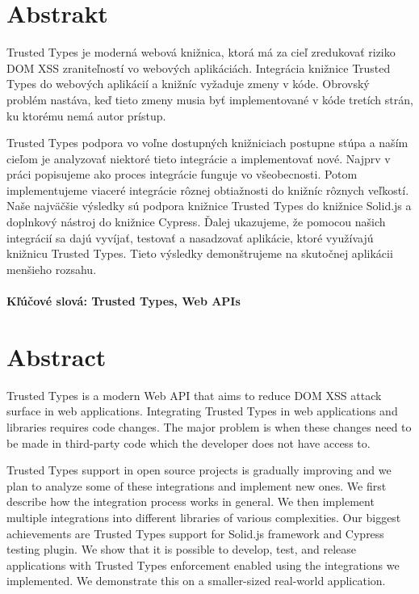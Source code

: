 \documentclass[12pt, twoside]{book}
\begin{document}

\newpage
\section*{Abstrakt}

Trusted Types je moderná webová knižnica, ktorá má za cieľ zredukovať riziko DOM XSS zraniteľností
vo webových aplikáciách. Integrácia knižnice Trusted Types do webových aplikácií a knižníc vyžaduje
zmeny v kóde. Obrovský problém nastáva, keď tieto zmeny musia byť implementované v kóde tretích
strán, ku ktorému nemá autor prístup.

Trusted Types podpora vo voľne dostupných knižniciach postupne stúpa a naším cieľom je analyzovať
niektoré tieto integrácie a implementovať nové. Najprv v práci popisujeme ako proces integrácie
funguje vo všeobecnosti. Potom implementujeme via\-ceré integrácie rôznej obtiažnosti do knižníc
rôznych veľkostí. Naše najväčšie výsledky sú podpora knižnice Trusted Types do knižnice Solid.js a
doplnkový nástroj do knižnice Cypress. Ďalej ukazujeme, že pomocou našich integrácií sa dajú
vyvíjať, testovať a nasadzovať aplikácie, ktoré využívajú knižnicu Trusted Types. Tieto výsledky
demonštrujeme na skutočnej aplikácii menšieho rozsahu.

\paragraph*{Kľúčové slová: Trusted Types, Web APIs}


\newpage
\section*{Abstract}

Trusted Types is a modern Web API that aims to reduce DOM XSS attack surface in web applications.
Integrating Trusted Types in web applications and libraries requires code changes. The major problem
is when these changes need to be made in third-party code which the developer does not have access
to.

Trusted Types support in open source projects is gradually improving and we plan to analyze some of
these integrations and implement new ones. We first describe how the integration process works in
general. We then implement multiple integrations into different libraries of various complexities.
Our biggest achievements are Trusted Types support for Solid.js framework and Cypress testing
plugin. We show that it is possible to develop, test, and release applications with Trusted Types
enforcement enabled using the integrations we implemented. We demonstrate this on a smaller-sized
real-world application.
\end{document}

